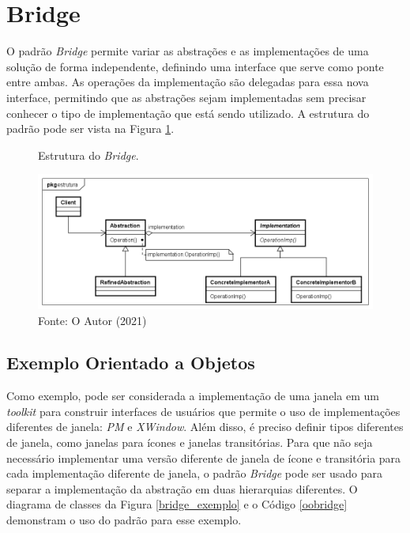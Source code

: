 \section{Bridge}

O padrão \textit{Bridge} permite variar as abstrações e as 
implementações de uma solução de forma independente, 
definindo uma interface que serve como ponte entre ambas. 
As operações da implementação são delegadas para essa 
nova interface, permitindo que as abstrações sejam 
implementadas sem precisar conhecer o tipo de 
implementação que está sendo utilizado. A estrutura do 
padrão pode ser vista na Figura \ref{bridge_struct}.\cite{gamma:1995}

\begin{figure}[htb]
	\caption{\label{bridge_struct}Estrutura do \textit{Bridge}.}
	\begin{center}
	    \includegraphics[scale=0.5]{5_padroes-contexto-funcional/5.2_estruturais/5.2.2_bridge/bridge_estrutura.png}
	\end{center}
  \caption*{Fonte: O Autor (2021)}
\end{figure}

\subsection*{Exemplo Orientado a Objetos}

Como exemplo, pode ser considerada a implementação de 
uma janela em um \textit{toolkit} para construir interfaces 
de usuários que permite o uso de implementações diferentes 
de janela: \textit{PM} e \textit{XWindow}. Além disso, é preciso definir tipos 
diferentes de janela, como janelas para ícones e janelas 
transitórias. Para que não seja necessário implementar 
uma versão diferente de janela de ícone e transitória 
para cada implementação diferente de janela, o padrão 
\textit{Bridge} pode ser usado para separar a implementação 
da abstração em duas hierarquias diferentes. O diagrama 
de classes da Figura \ref{bridge_exemplo} e o Código 
\ref{oobridge} demonstram o uso do padrão para esse 
exemplo.

